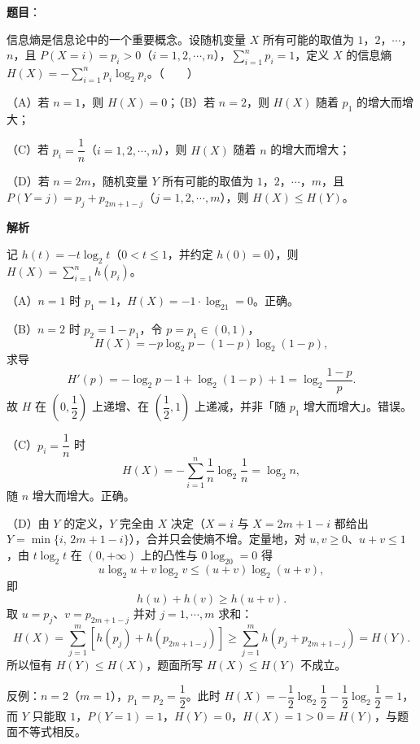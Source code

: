 \begin{answer}

\textbf{题目}：

信息熵是信息论中的一个重要概念。设随机变量 $X$ 所有可能的取值为 $1$，$2$，$\cdots$，$n$，且 $P(X=i)=p_i>0$（$i=1,2,\cdots,n$），$\sum\limits_{i=1}^n p_i=1$，定义 $X$ 的信息熵 $H(X)=-\sum\limits_{i=1}^n p_i\log_2p_i$。\mbox{（　　）}

（A）若 $n=1$，则 $H(X)=0$；（B）若 $n=2$，则 $H(X)$ 随着 $p_1$ 的增大而增大；

（C）若 $p_i=\dfrac1n$（$i=1,2,\cdots,n$），则 $H(X)$ 随着 $n$ 的增大而增大；

（D）若 $n=2m$，随机变量 $Y$ 所有可能的取值为 $1$，$2$，$\cdots$，$m$，且 $P(Y=j)=p_j+p_{2m+1-j}$（$j=1,2,\cdots,m$），则 $H(X)\leqslant H(Y)$。

\textbf{解析}

记 $h(t)=-t\log_2t$（$0<t\leqslant1$，并约定 $h(0)=0$），则 $H(X)=\sum\limits_{i=1}^n h(p_i)$。

（A）$n=1$ 时 $p_1=1$，$H(X)=-1\cdot\log_21=0$。正确。

（B）$n=2$ 时 $p_2=1-p_1$，令 $p=p_1\in(0,1)$，
\nopagebreak[4]
\[H(X)=-p\log_2p-(1-p)\log_2(1-p),\]
求导
\nopagebreak[4]
\[H'(p)=-\log_2p-1+\log_2(1-p)+1=\log_2\frac{1-p}{p}.\]
故 $H$ 在 $\left(0,\dfrac12\right)$ 上递增、在 $\left(\dfrac12,1\right)$ 上递减，并非「随 $p_1$ 增大而增大」。错误。

（C）$p_i=\dfrac1n$ 时
\nopagebreak[4]
\[H(X)=-\sum_{i=1}^n\frac1n\log_2\frac1n=\log_2n,\]
随 $n$ 增大而增大。正确。

（D）由 $Y$ 的定义，$Y$ 完全由 $X$ 决定（$X=i$ 与 $X=2m+1-i$ 都给出 $Y=\min\{i,\,2m+1-i\}$），合并只会使熵不增。定量地，对 $u,v\geqslant0$、$u+v\leqslant1$，由 $t\log_2t$ 在 $(0,+\infty)$ 上的凸性与 $0\log_20=0$ 得
\nopagebreak[4]
\[u\log_2u+v\log_2v\leqslant(u+v)\log_2(u+v),\]
即
\nopagebreak[4]
\[h(u)+h(v)\geqslant h(u+v).\]
取 $u=p_j$、$v=p_{2m+1-j}$ 并对 $j=1,\cdots,m$ 求和：
\nopagebreak[4]
\[H(X)=\sum_{j=1}^m\left[h(p_j)+h(p_{2m+1-j})\right]\geqslant\sum_{j=1}^mh\left(p_j+p_{2m+1-j}\right)=H(Y).\]
所以恒有 $H(Y)\leqslant H(X)$，题面所写 $H(X)\leqslant H(Y)$ 不成立。

反例：$n=2$（$m=1$），$p_1=p_2=\dfrac12$。此时 $H(X)=-\dfrac12\log_2\dfrac12-\dfrac12\log_2\dfrac12=1$，而 $Y$ 只能取 $1$，$P(Y=1)=1$，$H(Y)=0$，$H(X)=1>0=H(Y)$，与题面不等式相反。


\end{answer}
